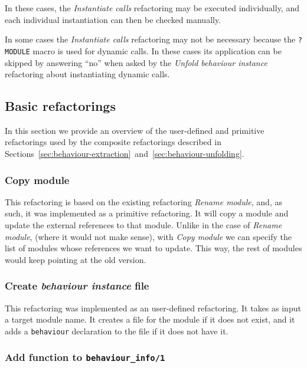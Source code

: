 In these cases, the \emph{Instantiate calls} refactoring may be executed
individually, and each individual instantiation can then be checked
manually.

In some cases the \emph{Instantiate calls} refactoring may not be
necessary because the \texttt{?MODULE} macro is used for dynamic calls.
In these cases its application can be skipped by answering ``no''
when asked by the \emph{Unfold behaviour instance} refactoring about
instantiating dynamic calls.


\subsection{Basic refactorings}

In this section we provide an overview of the user-defined and primitive
refactorings used by the composite refactorings described in 
Sections~\ref{sec:behaviour-extraction}~and~\ref{sec:behaviour-unfolding}.


\subsubsection{Copy module\label{sub:copy_mod}}

This refactoring is based on the existing refactoring \emph{Rename
module}, and, as such, it was implemented as a primitive refactoring.
It will copy a module and update the external references to that module.
Unlike in the case of \emph{Rename module}, (where it would not make
sense), with \emph{Copy module} we can specify the list of modules
whose references we want to update. This way, the rest of modules
would keep pointing at the old version.


\subsubsection{Create \emph{behaviour instance} file\label{sub:create_behav_instance}}

This refactoring was implemented as an user-defined refactoring. It
takes as input a target module name. It creates a file for the module
if it does not exist, and it adds a \texttt{behaviour} declaration
to the file if it does not have it.


\subsubsection{Add function to \texttt{behaviour\_info/1}\label{sub:add_callback}}

